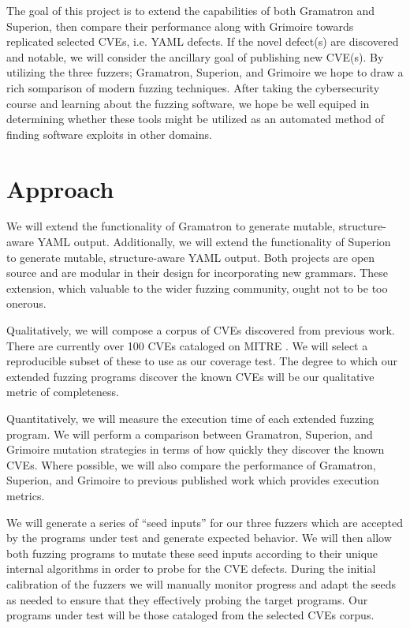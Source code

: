 \documentclass[12pt]{diazessay}
\begin{document}
The goal of this project is to extend the capabilities of both Gramatron and Superion, then compare their performance along with Grimoire towards replicated selected CVEs, i.e. YAML defects.
If the novel defect(s) are discovered and notable, we will consider the ancillary goal of publishing new CVE(s).
By utilizing the three fuzzers; Gramatron, Superion, and Grimoire we hope to draw a rich somparison of modern fuzzing techniques.
After taking the cybersecurity course and learning about the fuzzing software, we hope be well equiped in determining whether these tools might be utilized as an automated method of finding software exploits in other domains.



\section*{Approach}

We will extend the functionality of Gramatron to generate mutable, structure-aware YAML output.
Additionally, we will extend the functionality of Superion to generate mutable, structure-aware YAML output.
Both projects are open source and are modular in their design for incorporating new grammars.
These extension, which valuable to the wider fuzzing community, ought not to be too onerous.

Qualitatively, we will compose a corpus of CVEs discovered from previous work.
There are currently over 100 CVEs cataloged on MITRE \cite{MITRE}.
We will select a reproducible subset of these to use as our coverage test.
The degree to which our extended fuzzing programs discover the known CVEs will be our qualitative metric of completeness.

Quantitatively, we will measure the execution time of each extended fuzzing program.
We will perform a comparison between Gramatron, Superion, and Grimoire mutation strategies in terms of how quickly they discover the known CVEs.
Where possible, we will also compare the performance of Gramatron, Superion, and Grimoire to previous published work which provides execution metrics.

We will generate a series of ``seed inputs'' for our three fuzzers which are accepted by the programs under test and generate expected behavior.
We will then allow both fuzzing programs to mutate these seed inputs\cite{Seed} according to their unique internal algorithms in order to probe for the CVE defects.
During the initial calibration of the fuzzers we will manually monitor progress and adapt the seeds as needed to ensure that they effectively probing the target programs.
Our programs under test will be those cataloged from the selected CVEs corpus.
\end{document}
